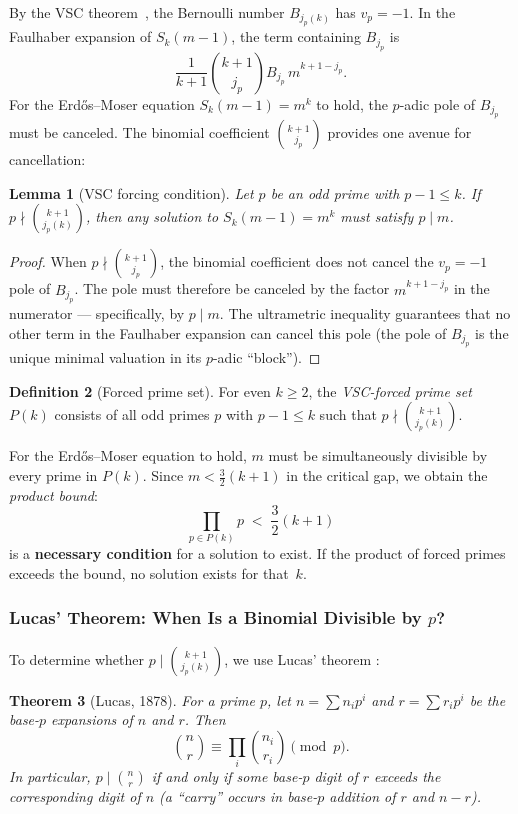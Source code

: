 \documentclass[12pt,a4paper]{article}
\theoremstyle{plain}
\newtheorem{theorem}{Theorem}[section]
\newtheorem{lemma}[theorem]{Lemma}
\theoremstyle{definition}
\newtheorem{definition}[theorem]{Definition}
\begin{document}
By the VSC theorem~\cite{vonStaudt,Clausen}, the Bernoulli number
$B_{j_p(k)}$ has $v_p = -1$.
In the Faulhaber expansion of $S_k(m-1)$, the term containing $B_{j_p}$
is
\[\label{eq:vsc-term}
  \frac{1}{k+1}\binom{k+1}{j_p} B_{j_p}\,m^{k+1-j_p}.
\]
For the Erd\H{o}s--Moser equation $S_k(m-1) = m^k$ to hold, the
$p$-adic pole of $B_{j_p}$ must be canceled.  The binomial coefficient
$\binom{k+1}{j_p}$ provides one avenue for cancellation:

\begin{lemma}[VSC forcing condition]\label{lem:vsc-forcing}
  Let $p$ be an odd prime with $p-1 \le k$.  If
  $p \nmid \binom{k+1}{j_p(k)}$, then any solution to
  $S_k(m-1) = m^k$ must satisfy $p \mid m$.
\end{lemma}

\begin{proof}
  When $p \nmid \binom{k+1}{j_p}$, the binomial coefficient does not
  cancel the $v_p = -1$ pole of $B_{j_p}$.  The pole must therefore be
  canceled by the factor $m^{k+1-j_p}$ in the numerator --- specifically,
  by $p \mid m$.  The ultrametric inequality guarantees that no other
  term in the Faulhaber expansion can cancel this pole (the pole of
  $B_{j_p}$ is the unique minimal valuation in its $p$-adic ``block'').
\end{proof}

\begin{definition}[Forced prime set]\label{def:forced}
  For even $k \ge 2$, the \emph{VSC-forced prime set} $P(k)$ consists
  of all odd primes $p$ with $p-1 \le k$ such that
  $p \nmid \binom{k+1}{j_p(k)}$.
\end{definition}

For the Erd\H{o}s--Moser equation to hold, $m$ must be simultaneously
divisible by every prime in $P(k)$.  Since $m < \frac{3}{2}(k+1)$ in
the critical gap, we obtain the \emph{product bound}:
\[\label{eq:product-bound}
  \prod_{p \in P(k)} p \; < \; \frac{3}{2}(k+1)
\]
is a \textbf{necessary condition} for a solution to exist.  If the
product of forced primes exceeds the bound, no solution exists for
that~$k$.

\subsubsection{Lucas' Theorem: When Is a Binomial Divisible by $p$?}

To determine whether $p \mid \binom{k+1}{j_p(k)}$, we use Lucas' theorem
\cite{Lucas}:

\begin{theorem}[Lucas, 1878]\label{thm:lucas}
  For a prime $p$, let $n = \sum n_i p^i$ and $r = \sum r_i p^i$ be the
  base-$p$ expansions of $n$ and $r$.  Then
  \[\label{eq:lucas}
    \binom{n}{r} \equiv \prod_i \binom{n_i}{r_i} \pmod{p}.
  \]
  In particular, $p \mid \binom{n}{r}$ if and only if some base-$p$ digit
  of $r$ exceeds the corresponding digit of $n$ (a ``carry'' occurs in
  base-$p$ addition of $r$ and $n-r$).
\end{theorem}
\end{document}
